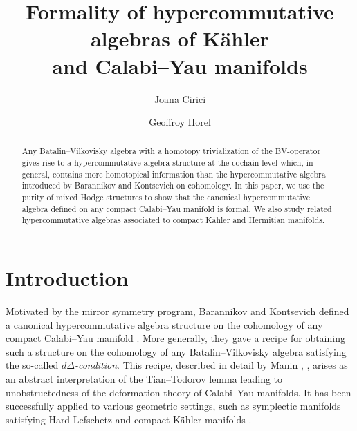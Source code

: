 \documentclass[a4paper]{amsart}
\title[Formality of hypercommutative algebras of Kähler
and Calabi--Yau manifolds]{Formality of hypercommutative algebras of Kähler\\
and Calabi--Yau manifolds}
\author{Joana Cirici}
\author{Geoffroy Horel}
\theoremstyle{definition}
\theoremstyle{theorem}
\begin{document}
\begin{abstract}
Any Batalin--Vilkovisky algebra with a homotopy trivialization of the BV-operator gives rise to a hypercommutative algebra structure at the cochain level which, in general,
contains more homotopical information than the hypercommutative algebra introduced by Barannikov and Kontsevich on cohomology. In this paper, we use the purity of mixed Hodge structures to show that the canonical hypercommutative algebra defined on any compact Calabi--Yau manifold is formal. We also study related hypercommutative algebras associated to compact Kähler and Hermitian manifolds.
\end{abstract}

\maketitle

\section{Introduction}
Motivated by the mirror symmetry program,
Barannikov and Kontsevich defined a canonical hypercommutative algebra structure on the cohomology of any compact Calabi--Yau manifold \cite{BaKo}.
More generally, they gave a recipe for obtaining such a structure on the cohomology of any Batalin--Vilkovisky algebra satisfying the so-called \textit{$d\Delta$-condition}. This recipe, described in detail by Manin \cite{Maninbook}, \cite{Manin3},
arises as an abstract interpretation of the Tian--Todorov lemma leading to unobstructedness of the deformation theory of Calabi--Yau manifolds. It has been successfully applied to various geometric settings, such as symplectic manifolds satisfying Hard Lefschetz \cite{Merkulov} and compact Kähler manifolds \cite{CaZh}.
\end{document}
